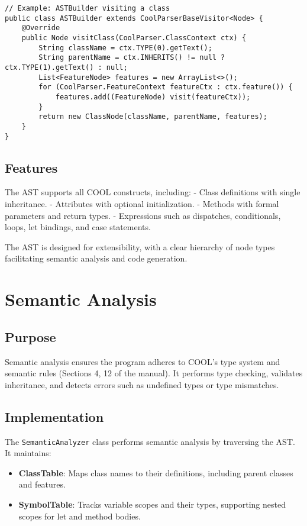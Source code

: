 \documentclass[titlepage]{article}
\begin{document}
\begin{lstlisting}
// Example: ASTBuilder visiting a class
public class ASTBuilder extends CoolParserBaseVisitor<Node> {
    @Override
    public Node visitClass(CoolParser.ClassContext ctx) {
        String className = ctx.TYPE(0).getText();
        String parentName = ctx.INHERITS() != null ? ctx.TYPE(1).getText() : null;
        List<FeatureNode> features = new ArrayList<>();
        for (CoolParser.FeatureContext featureCtx : ctx.feature()) {
            features.add((FeatureNode) visit(featureCtx));
        }
        return new ClassNode(className, parentName, features);
    }
}
\end{lstlisting}

\subsection{Features}

The AST supports all COOL constructs, including:
- Class definitions with single inheritance.
- Attributes with optional initialization.
- Methods with formal parameters and return types.
- Expressions such as dispatches, conditionals, loops, let bindings, and case statements.

The AST is designed for extensibility, with a clear hierarchy of node types facilitating semantic analysis and code generation.

\section{Semantic Analysis}

\subsection{Purpose}

Semantic analysis ensures the program adheres to COOL's type system and semantic rules (Sections 4, 12 of the manual). It performs type checking, validates inheritance, and detects errors such as undefined types or type mismatches.

\subsection{Implementation}

The \texttt{SemanticAnalyzer} class performs semantic analysis by traversing the AST. It maintains:

\begin{itemize}
    \item \textbf{ClassTable}: Maps class names to their definitions, including parent classes and features.
    \item \textbf{SymbolTable}: Tracks variable scopes and their types, supporting nested scopes for let and method bodies.
\end{itemize}
\end{document}

